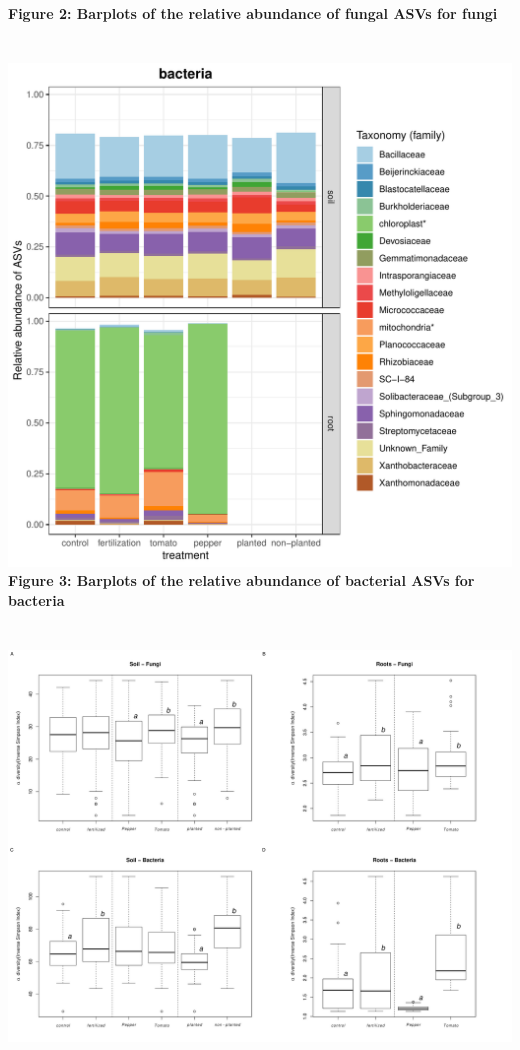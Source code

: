 \documentclass[11pt,]{article}
\begin{document}
\textbf{Figure 2: Barplots of the relative abundance of fungal ASVs for
fungi}\\
\hspace*{0.333em} ~\\
\hspace*{0.333em}\\
\includegraphics[width=7.29167in]{../figures/Figure4_FAMILY_barplots_bacteria.pdf}\\
\textbf{Figure 3: Barplots of the relative abundance of bacterial ASVs
for bacteria}\\
\hspace*{0.333em} ~\\
\hspace*{0.333em}\\
\includegraphics[width=6.25000in]{../figures/Figure5_alpha.pdf}\\
\end{document}

